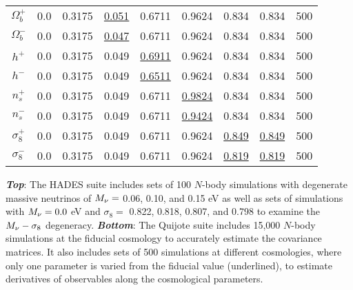 \begin{table}
\begin{center}
\begin{tabular}{ccccccccc}
    $\Omega_b^+$    & 0.0   & 0.3175 & \underline{0.051} & 0.6711 & 0.9624 & 0.834 & 0.834 & 500 \\ 
    $\Omega_b^-$    & 0.0   & 0.3175 & \underline{0.047} & 0.6711 & 0.9624 & 0.834 & 0.834 & 500 \\ 
    $h^+$           & 0.0   & 0.3175 & 0.049 & \underline{0.6911} & 0.9624 & 0.834 & 0.834 & 500 \\ 
    $h^-$           & 0.0   & 0.3175 & 0.049 & \underline{0.6511} & 0.9624 & 0.834 & 0.834 & 500 \\ 
    $n_s^+$         & 0.0   & 0.3175 & 0.049 & 0.6711 & \underline{0.9824} & 0.834 & 0.834 & 500 \\ 
    $n_s^-$         & 0.0   & 0.3175 & 0.049 & 0.6711 & \underline{0.9424} & 0.834 & 0.834 & 500 \\ 
    $\sigma_8^+$    & 0.0   & 0.3175 & 0.049 & 0.6711 & 0.9624 & \underline{0.849} & \underline{0.849} & 500 \\ 
    $\sigma_8^-$    & 0.0   & 0.3175 & 0.049 & 0.6711 & 0.9624 & \underline{0.819} & \underline{0.819} & 500 \\[3pt]
    \hline
\end{tabular} \label{tab:sims}
\end{center}
    {\bf \em Top}: The HADES suite includes sets of 100 $N$-body simulations with degenerate massive neutrinos 
    of $M_\nu = $ 0.06, 0.10, and 0.15 eV as well as sets of simulations with $M_\nu = 0.0$ eV and 
    $\sigma_8 = $ 0.822, 0.818, 0.807, and 0.798 to examine the $M_\nu-\sigma_8$ degeneracy. 
    {\bf \em Bottom}: The Quijote suite includes 15,000 $N$-body simulations at the fiducial 
    cosmology to accurately estimate the covariance matrices. It also includes sets of 500 
    simulations at different cosmologies, where only one parameter is varied from the fiducial 
    value (underlined), to estimate derivatives of observables along the cosmological parameters.
\end{table}
